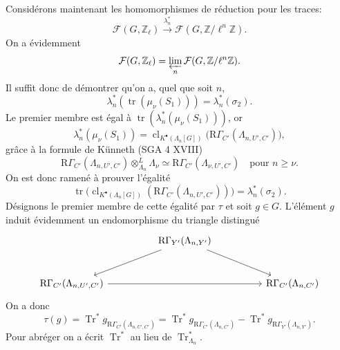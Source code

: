\documentclass[11pt]{article}
\providecommand{\Tr}{\operatorname{Tr}}
\providecommand{\Tr}{\operatorname{Tr}}
\providecommand{\Tr}{\operatorname{Tr}}
\providecommand{\Tr}{\operatorname{Tr}}
\providecommand{\clKstar}[1]{\operatorname{cl}_{K^{\bullet}(#1)}}
\providecommand{\RG}{\mathrm R\Gamma}
\providecommand{\Tr}{\operatorname{Tr}}
\begin{document}
Considérons maintenant les homomorphismes de réduction pour les traces:
\[
\mathcal F(G,\mathbb Z_\ell)\xrightarrow{\lambda_n^*}\mathcal F(G,\mathbb Z/\ell^n\mathbb Z).
\]
On a évidemment
\[
\mathcal F(G,\mathbb Z_\ell)=\varprojlim_n\mathcal F(G,\mathbb Z/\ell^n\mathbb Z).
\]
Il suffit donc de démontrer qu'on a, quel que soit $n$,
\[
\lambda_n^*(\operatorname{tr}(\mu_\nu(S_1)))=\lambda_n^*(\sigma_2).
\]
Le premier membre est égal à $\operatorname{tr}(\lambda_n^*(\mu_\nu(S_1)))$, or
\[
\lambda_n^*(\mu_\nu(S_1))
=
\clKstar{\Lambda_n[G]}\bigl(\RG_{C'}(\Lambda_{n,U',C'})\bigr),
\]
grâce à la formule de Künneth (SGA 4 XVIII)
\[
\RG_{C'}(\Lambda_{n,U',C'})\otimes_{\Lambda_n}^{L}\Lambda_\nu
\simeq \RG_{C'}(\Lambda_{\nu,U',C'})
\quad\text{pour } n\ge\nu.
\]
On est donc ramené à prouver l'égalité
\[
\operatorname{tr}\bigl(\clKstar{\Lambda_n[G]}(\RG_{C'}(\Lambda_{n,U',C'}))\bigr)
=
\lambda_n^*(\sigma_2).
\]
Désignons le premier membre de cette égalité par $\tau$ et soit $g\in G$. L'élément $g$ induit évidemment un endomorphisme du triangle distingué
\[
\begin{tikzcd}[column sep=huge,row sep=large]
& \RG_{Y'}(\Lambda_{n,Y'}) \arrow[dl] \arrow[dr] & \\
\RG_{C'}(\Lambda_{n,U',C'}) \arrow[rr] && \RG_{C'}(\Lambda_{n,C'})
\end{tikzcd}
\]
On a donc
\[
\tau(g)=\Tr^*g_{\RG_{C'}(\Lambda_{n,U',C'})}
=\Tr^*g_{\RG_{C'}(\Lambda_{n,C'})}
-\Tr^*g_{\RG_{Y'}(\Lambda_{n,Y'})}.
\]
Pour abréger on a écrit $\Tr^*$ au lieu de $\Tr^*_{\Lambda_n}$.
\end{document}
